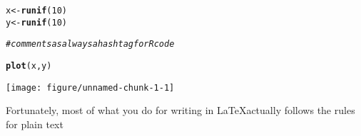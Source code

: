 \documentclass{article}\usepackage[]{graphicx}\usepackage[]{color}
\makeatletter
\def\maxwidth{ %
  \ifdim\Gin@nat@width>\linewidth
    \linewidth
  \else
    \Gin@nat@width
  \fi
}
\newcommand{\hlnum}[1]{\textcolor[rgb]{0.686,0.059,0.569}{#1}}%
\newcommand{\hlcom}[1]{\textcolor[rgb]{0.678,0.584,0.686}{\textit{#1}}}%
\newcommand{\hlstd}[1]{\textcolor[rgb]{0.345,0.345,0.345}{#1}}%
\newcommand{\hlkwb}[1]{\textcolor[rgb]{0.69,0.353,0.396}{#1}}%
\newcommand{\hlkwd}[1]{\textcolor[rgb]{0.737,0.353,0.396}{\textbf{#1}}}%
\newenvironment{kframe}{%
 \def\at@end@of@kframe{}%
 \ifinner\ifhmode%
  \def\at@end@of@kframe{\end{minipage}}%
  \begin{minipage}{\columnwidth}%
 \fi\fi%
 \def\FrameCommand##1{\hskip\@totalleftmargin \hskip-\fboxsep
 \colorbox{shadecolor}{##1}\hskip-\fboxsep
     \hskip-\linewidth \hskip-\@totalleftmargin \hskip\columnwidth}%
 \MakeFramed {\advance\hsize-\width
   \@totalleftmargin\z@ \linewidth\hsize
   \@setminipage}}%
 {\par\unskip\endMakeFramed%
 \at@end@of@kframe}
\newenvironment{knitrout}{}{} %
\makeatother
\begin{document}
\begin{knitrout}
\color{fgcolor}\begin{kframe}
\begin{alltt}
\hlstd{x} \hlkwb{<-} \hlkwd{runif}\hlstd{(}\hlnum{10}\hlstd{)}
\hlstd{y} \hlkwb{<-} \hlkwd{runif}\hlstd{(}\hlnum{10}\hlstd{)}

\hlcom{#comments as always a hashtag for R code}

\hlkwd{plot}\hlstd{(x,y)}
\end{alltt}
\end{kframe}
\texttt{[image: figure/unnamed-chunk-1-1]} 
\end{knitrout}



Fortunately, most of what you do for writing in \LaTeX actually follows the rules for plain text
\end{document}
